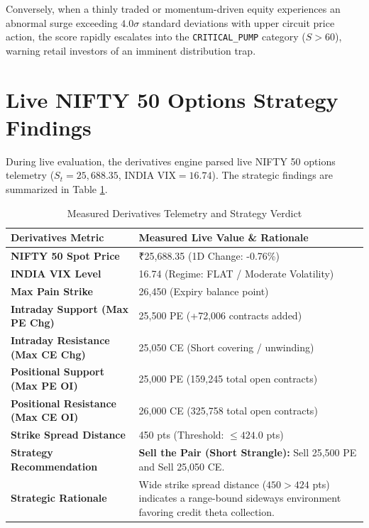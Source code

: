 Conversely, when a thinly traded or momentum-driven equity experiences an abnormal surge exceeding $4.0\sigma$ standard deviations with upper circuit price action, the score rapidly escalates into the \texttt{CRITICAL\_PUMP} category ($S > 60$), warning retail investors of an imminent distribution trap.

\section{Live NIFTY 50 Options Strategy Findings}
During live evaluation, the derivatives engine parsed live NIFTY 50 options telemetry ($S_t = 25,688.35$, $\text{INDIA VIX} = 16.74$). The strategic findings are summarized in Table \ref{tab:options_results}.

\begin{table}[H]
\centering
\caption{Measured Derivatives Telemetry and Strategy Verdict}
\label{tab:options_results}
\begin{tabularx}{\textwidth}{@{}p{5cm}X@{}}
\toprule
\textbf{Derivatives Metric} & \textbf{Measured Live Value \& Rationale} \\
\midrule
\textbf{NIFTY 50 Spot Price} & ₹25,688.35 (1D Change: -0.76\%) \\
\textbf{INDIA VIX Level} & 16.74 (Regime: FLAT / Moderate Volatility) \\
\textbf{Max Pain Strike} & 26,450 (Expiry balance point) \\
\textbf{Intraday Support (Max PE Chg)} & 25,500 PE (+72,006 contracts added) \\
\textbf{Intraday Resistance (Max CE Chg)} & 25,050 CE (Short covering / unwinding) \\
\textbf{Positional Support (Max PE OI)} & 25,000 PE (159,245 total open contracts) \\
\textbf{Positional Resistance (Max CE OI)} & 26,000 CE (325,758 total open contracts) \\
\textbf{Strike Spread Distance} & 450 pts (Threshold: $\le 424.0$ pts) \\
\textbf{Strategy Recommendation} & \textbf{Sell the Pair (Short Strangle):} Sell 25,500 PE and Sell 25,050 CE. \\
\textbf{Strategic Rationale} & Wide strike spread distance ($450 > 424$ pts) indicates a range-bound sideways environment favoring credit theta collection. \\
\bottomrule
\end{tabularx}
\end{table}

